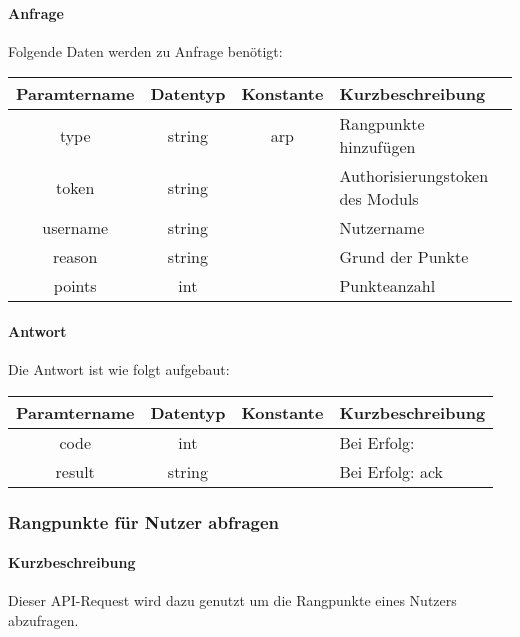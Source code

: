 \paragraph{Anfrage}Folgende Daten werden zu Anfrage benötigt:
\begin{table}[H]
	\begin{tabular}{|c|c|c|p{6.5cm}|}
		\hline
		\textbf{Paramtername} & \textbf{Datentyp} & \textbf{Konstante} & \textbf{Kurzbeschreibung}                                                                                               \\ \hline
		type                & string            & arp                & Rangpunkte hinzufügen \\ \hline
		token               & string            &                    & Authorisierungstoken des Moduls \\ \hline
		username            & string            &                    & Nutzername \\ \hline
		reason              & string            &                    & Grund der Punkte \\ \hline
		points              & int               &                    & Punkteanzahl \\ \hline
	\end{tabular}
\end{table}
\paragraph{Antwort}Die Antwort ist wie folgt aufgebaut:
\begin{table}[H]
	\begin{tabular}{|c|c|c|p{6.5cm}|}
		\hline
		\textbf{Paramtername} & \textbf{Datentyp} & \textbf{Konstante} & \textbf{Kurzbeschreibung}            \\ \hline                
		code                & int              &                 & Bei Erfolg: {\glqq 0\grqq} \\ \hline
		result              & string           &                 & Bei Erfolg: {\glqq ack\grqq} \\ \hline
	\end{tabular}
\end{table}
\subsubsection{Rangpunkte für Nutzer abfragen}
\paragraph{Kurzbeschreibung}Dieser API-Request wird dazu genutzt um die Rangpunkte eines Nutzers abzufragen.
